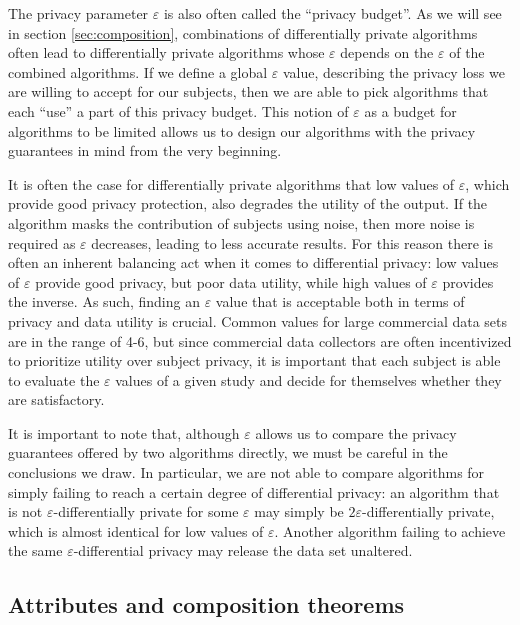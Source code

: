 \documentclass[12pt]{article}
\renewcommand{\epsilon}{\varepsilon}
\begin{document}
The privacy parameter $\epsilon$ is also often called the ``privacy budget''. As we will see in section \ref{sec:composition}, combinations of differentially private algorithms often lead to differentially private algorithms whose $\epsilon$ depends on the $\epsilon$ of the combined algorithms. If we define a global $\epsilon$ value, describing the privacy loss we are willing to accept for our subjects, then we are able to pick algorithms that each ``use'' a part of this privacy budget. This notion of $\epsilon$ as a budget for algorithms to be limited allows us to design our algorithms with the privacy guarantees in mind from the very beginning.

It is often the case for differentially private algorithms that low values of $\epsilon$, which provide good privacy protection, also degrades the utility of the output. If the algorithm masks the contribution of subjects using noise, then more noise is required as $\epsilon$ decreases, leading to less accurate results. For this reason there is often an inherent balancing act when it comes to differential privacy: low values of $\epsilon$ provide good privacy, but poor data utility, while high values of $\epsilon$ provides the inverse. As such, finding an $\epsilon$ value that is acceptable both in terms of privacy and data utility is crucial. Common values for large commercial data sets \cite{apple_differential,us_census} are in the range of 4-6, but since commercial data collectors are often incentivized to prioritize utility over subject privacy, it is important that each subject is able to evaluate the $\epsilon$ values of a given study and decide for themselves whether they are satisfactory. \bigskip

It is important to note that, although $\epsilon$ allows us to compare the privacy guarantees offered by two algorithms directly, we must be careful in the conclusions we draw. In particular, we are not able to compare algorithms for simply failing to reach a certain degree of differential privacy: an algorithm that is not $\epsilon$-differentially private for some $\epsilon$ may simply be $2\epsilon$-differentially private, which is almost identical for low values of $\epsilon$. Another algorithm failing to achieve the same $\epsilon$-differential privacy may release the data set unaltered.



\subsection{Attributes and composition theorems \label{sec:composition}}
\end{document}
